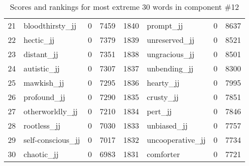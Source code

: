 \begin{table}[tbp]
\begin{tabular}{| rlr@{.}l | rlr@{.}l |}
    21 & bloodthirsty\_jj & 0 & 7459    &    1840 & prompt\_jj & 0 & 8637 \\
    22 & hectic\_jj & 0 & 7379    &    1839 & unreserved\_jj & 0 & 8521 \\
    23 & distant\_jj & 0 & 7351    &    1838 & ungracious\_jj & 0 & 8501 \\
    24 & autistic\_jj & 0 & 7307    &    1837 & unbending\_jj & 0 & 8300 \\
    25 & mawkish\_jj & 0 & 7295    &    1836 & hearty\_jj & 0 & 7995 \\
    26 & profound\_jj & 0 & 7290    &    1835 & crusty\_jj & 0 & 7851 \\
    27 & otherworldly\_jj & 0 & 7210    &    1834 & pert\_jj & 0 & 7846 \\
    28 & rootless\_jj & 0 & 7030    &    1833 & unbiased\_jj & 0 & 7757 \\
    29 & self-conscious\_jj & 0 & 7017    &    1832 & uncooperative\_jj & 0 & 7734 \\
    30 & chaotic\_jj & 0 & 6983    &    1831 & comforter & 0 & 7721 \\
    \hline
    \end{tabular}
    \caption{Scores and rankings for most extreme 30 words in component \#12} 
\end{table}
\clearpage
